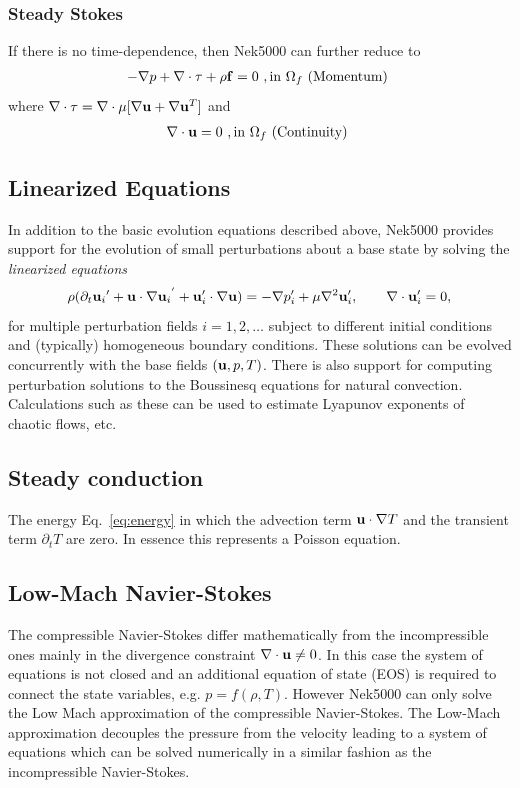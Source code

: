 \subsubsection*{Steady Stokes }
If there is no time-dependence, then Nek5000 can further reduce to
\begin{eqnarray}\label{eq:ns_momentum_steady_stokes}
 - \nabla p + \nabla \cdot \tau + \rho {\bf f}=0 \,\, , \text{in } \Omega_f \text{  (Momentum)  }
\end{eqnarray}
where $\nabla \cdot\tau=\nabla\cdot\mu[\nabla \mathbf{u}+\nabla {\mathbf{u} }^{T}]$ and
\begin{eqnarray}\label{eq:ns_cont}
 \nabla \cdot {\bf u} =0 \,\, , \text{in } \Omega_f  \text{  (Continuity)  } 
\end{eqnarray}

\subsection*{Linearized Equations}
In addition to the basic evolution equations described above, Nek5000
provides support for the evolution of small perturbations about
a base state by solving the {\em linearized equations}
\begin{equation} \label{eq:pertu}
  \rho(\partial_{t} {{\bf u}_i}' + {\bf u} \cdot \nabla {{\bf u}_i}^{'} + {\bf u}_i' \cdot \nabla {\bf u}) =
   - \nabla p_i' + \mu \nabla^2 {\bf u}_i', \qquad \nabla \cdot {\bf u}_i' = 0,
\end{equation}
for multiple perturbation fields $i=1,2,\dots$ subject to different initial
conditions and (typically) homogeneous boundary conditions.  
These solutions can be evolved concurrently with the base fields $({\bf u},p,T)$.
There is also
support for computing perturbation solutions to the Boussinesq equations for
natural convection.  Calculations such as these can be used to estimate Lyapunov exponents of chaotic flows, etc.



\subsection*{Steady conduction}    
The energy Eq.~\ref{eq:energy} in which the advection term ${\bf u} \cdot \nabla T$
    and the transient term $\partial_{t} T$ are zero. In essence this represents a Poisson equation.
    

\subsection*{Low-Mach Navier-Stokes}\label{sec:lowma}
The compressible Navier-Stokes differ mathematically from the incompressible ones mainly in the divergence constraint $\nabla \cdot \mathbf{u}\neq 0$. In this case the system of equations is not closed and an additional equation of state (EOS) is required to connect the state variables, e.g. $p=f(\rho,T)$. However Nek5000 can only solve the Low Mach approximation of the compressible Navier-Stokes. The Low-Mach approximation decouples the pressure from the velocity leading to a system of equations which can be solved numerically in a similar fashion as the incompressible Navier-Stokes.

